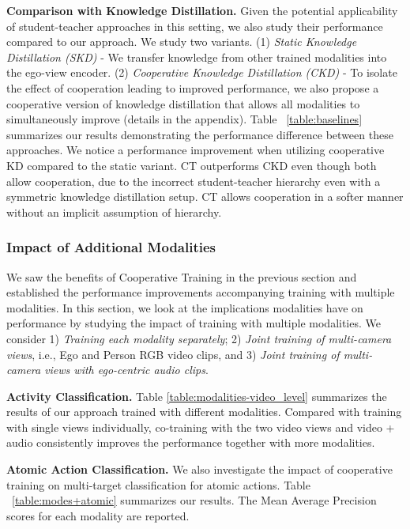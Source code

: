 \documentclass[final]{cvpr}
\begin{document}
\noindent\textbf{Comparison with Knowledge Distillation.} Given the potential applicability of student-teacher approaches in this setting, we also study their performance compared to our approach. We study two variants. {(1) \textit{Static Knowledge Distillation (SKD)}} - We transfer knowledge from other trained modalities into the ego-view encoder. {(2) \textit{Cooperative Knowledge Distillation (CKD)}} - To isolate the effect of cooperation leading to improved performance, we also propose a cooperative version of knowledge distillation that allows all modalities to simultaneously improve (details in the appendix). Table ~\ref{table:baselines} summarizes our results demonstrating the performance difference between these approaches. We notice a performance improvement when utilizing cooperative KD compared to the static variant. CT outperforms CKD even though both allow cooperation, due to the incorrect student-teacher hierarchy even with a symmetric knowledge distillation setup. CT allows cooperation in a softer manner without an implicit assumption of hierarchy.

\subsubsection{Impact of Additional Modalities}

We saw the benefits of Cooperative Training in the previous section and established the performance improvements accompanying training with multiple modalities. In this section, we look at the implications modalities have on performance by studying the impact of training with multiple modalities. We consider 1) \textit{Training each modality separately}; 2) \textit{Joint training of multi-camera views}, i.e., Ego and  Person RGB video clips, and 3) \textit{Joint training of multi-camera views with ego-centric audio clips}.

\noindent\textbf{Activity Classification.} Table \ref{table:modalities-video_level} summarizes the results of our approach trained with different modalities. Compared with training with single views individually, co-training with the two video views and video + audio consistently improves the performance together with more modalities.

\noindent\textbf{Atomic Action Classification.} We also investigate the impact of cooperative training on multi-target classification for atomic actions. Table ~\ref{table:modes+atomic} summarizes our results. The Mean Average Precision scores for each modality are reported.
\end{document}
